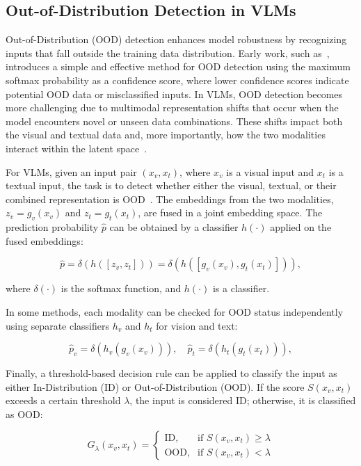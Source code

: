 \subsection{Out-of-Distribution Detection in VLMs}
Out-of-Distribution (OOD) detection enhances model robustness by recognizing inputs that fall outside the training data distribution. Early work, such as~\cite{hendrycks2016baseline}, introduces a simple and effective method for OOD detection using the maximum softmax probability as a confidence score, where lower confidence scores indicate potential OOD data or misclassified inputs. In VLMs, OOD detection becomes more challenging due to multimodal representation shifts that occur when the model encounters novel or unseen data combinations. These shifts impact both the visual and textual data and, more importantly, how the two modalities interact within the latent space~\cite{tan2019lxmert, lu2019vilbert}.

For VLMs, given an input pair \( (x_v, x_t) \), where \( x_v \) is a visual input and \( x_t \) is a textual input, the task is to detect whether either the visual, textual, or their combined representation is OOD~\cite{dong2024multiood, jiang2024negative, duong2023general, zang2024overcoming, bordes2024introduction}. The embeddings from the two modalities, \( z_v = g_v(x_v) \) and \( z_t = g_t(x_t) \), are fused in a joint embedding space. The prediction probability \( \hat{p} \) can be obtained by a classifier \( h(\cdot) \) applied on the fused embeddings:

\begin{equation}
\hat{p} = \delta(h([z_v, z_t])) = \delta(h([g_v(x_v), g_t(x_t)])),
\end{equation}

where \( \delta(\cdot) \) is the softmax function, and \( h(\cdot) \) is a classifier.

In some methods, each modality can be checked for OOD status independently using separate classifiers \( h_v \) and \( h_t \) for vision and text:

\begin{equation}
\hat{p}_v = \delta(h_v(g_v(x_v))), \quad \hat{p}_t = \delta(h_t(g_t(x_t))),
\end{equation}

Finally, a threshold-based decision rule can be applied to classify the input as either In-Distribution (ID) or Out-of-Distribution (OOD). If the score \( S(x_v, x_t) \) exceeds a certain threshold \( \lambda \), the input is considered ID; otherwise, it is classified as OOD:

\begin{equation}
G_\lambda(x_v, x_t) = 
    \begin{cases} 
       \text{ID}, & \text{if } S(x_v, x_t) \geq \lambda \\
       \text{OOD}, & \text{if } S(x_v, x_t) < \lambda 
    \end{cases}
\end{equation}